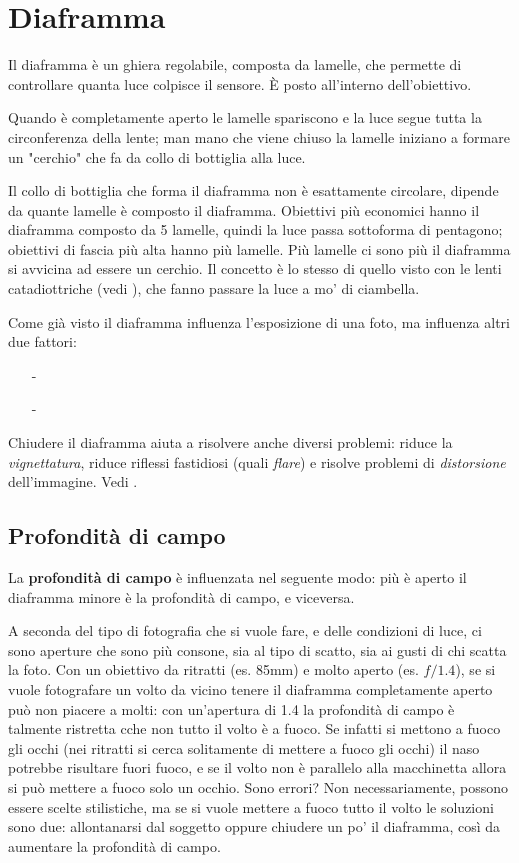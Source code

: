 \section{Diaframma} \label{sec:diaframma}
Il diaframma è un ghiera regolabile, composta da lamelle, che permette di controllare quanta luce colpisce il sensore. È posto all'interno dell'obiettivo.

Quando è completamente aperto le lamelle spariscono e la luce segue tutta la circonferenza della lente; man mano che viene chiuso la lamelle iniziano a formare un "cerchio" che fa da collo di bottiglia alla luce.

Il collo di bottiglia che forma il diaframma non è esattamente circolare, dipende da quante lamelle è composto il diaframma. Obiettivi più economici hanno il diaframma composto da 5 lamelle, quindi la luce passa sottoforma di pentagono; obiettivi di fascia più alta hanno più lamelle. Più lamelle ci sono più il diaframma si avvicina ad essere un cerchio.
Il concetto è lo stesso di quello visto con le lenti catadiottriche (vedi ), che fanno passare la luce a mo' di ciambella.

Come già visto il diaframma influenza l'esposizione di una foto, ma influenza altri due fattori:
\begin{itemize}
    \item[-] \textbf{}
    \item[-] \textbf{}
\end{itemize}

Chiudere il diaframma aiuta a risolvere anche diversi problemi: riduce la \textit{vignettatura}, riduce riflessi fastidiosi (quali \textit{flare}) e risolve problemi di \textit{distorsione} dell'immagine.
Vedi .

\subsection{Profondità di campo} \label{subsec:diaframmapdc}
La \textbf{profondità di campo} è influenzata nel seguente modo: più è aperto il diaframma minore è la profondità di campo, e viceversa.

A seconda del tipo di fotografia che si vuole fare, e delle condizioni di luce, ci sono aperture che sono più consone, sia al tipo di scatto, sia ai gusti di chi scatta la foto.
Con un obiettivo da ritratti (es. 85mm) e molto aperto (es. $f/1.4$), se si vuole fotografare un volto da vicino tenere il diaframma completamente aperto può non piacere a molti: con un'apertura di 1.4 la profondità di campo è talmente ristretta cche non tutto il volto è a fuoco. Se infatti si mettono a fuoco gli occhi (nei ritratti si cerca solitamente di mettere a fuoco gli occhi) il naso potrebbe risultare fuori fuoco, e se il volto non è parallelo alla macchinetta allora si può mettere a fuoco solo un occhio.
Sono errori? Non necessariamente, possono essere scelte stilistiche, ma se si vuole mettere a fuoco tutto il volto le soluzioni sono due: allontanarsi dal soggetto oppure chiudere un po' il diaframma, così da aumentare la profondità di campo.

